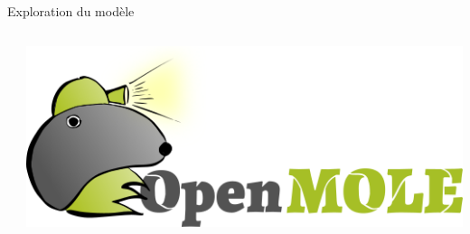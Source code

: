 \documentclass{beamer}
\begin{document}
\begin{frame}{}
\begin{columns}[t]
\begin{column}{.49\textwidth}
\begin{block}{Exploration du modèle}
\begin{columns}[t]
\begin{column}{.7\textwidth}
        \end{column}
		\begin{column}{.25\textwidth}
        	\includegraphics[width=\linewidth]{figures/openmole4.png}
        \end{column}
        \end{columns}
        \end{block}

        
        
%                    
%          
%
%          
%           
%        
        
      \end{column}
      

\end{columns}
\end{frame}
\end{document}
